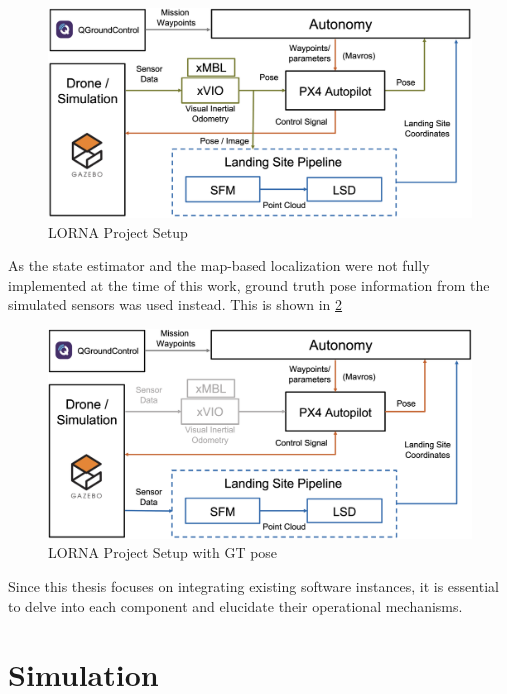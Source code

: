 \documentclass{article}
\begin{document}
\begin{figure}[ht]
    \centering
    \includegraphics[scale=0.18]{images/system_overview/setup_flowchart_with_vio.png}
    \caption{LORNA Project Setup}
    \label{fig:lorna_setup}
\end{figure}

As the state estimator and the map-based localization were not fully implemented at the time of this work, ground truth pose information from the simulated sensors was used instead. This is shown in \cref{fig:lorna_setup_GT_pose}

\begin{figure}[ht]
    \centering
    \includegraphics[scale=0.18]{images/system_overview/setup_flowchart.png}
    \caption{LORNA Project Setup with GT pose}
    \label{fig:lorna_setup_GT_pose}
\end{figure}

Since this thesis focuses on integrating existing software instances, it is essential to delve into each component and elucidate their operational mechanisms.

\clearpage %
\section{Simulation}\label{sec:simulation}
\end{document}
